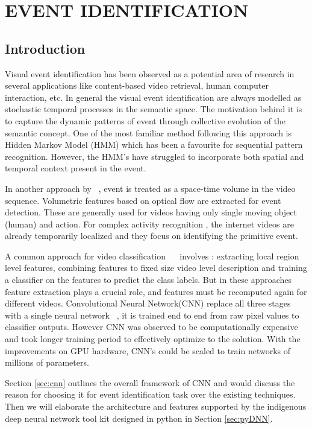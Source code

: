 \chapter{EVENT IDENTIFICATION}
 \label{chap:eventrec}
 \section{Introduction}
Visual event identification has been observed as a potential area of research in several applications like  content-based video retrieval, human computer interaction, etc.  In general the visual event identification are always modelled as stochastic temporal processes in the semantic space.  The motivation behind it is to capture the dynamic patterns of event through collective evolution of the semantic concept.  One of the most familiar method following this approach is Hidden Markov Model (HMM) which has been a favourite for 	sequential pattern recognition.  However, the HMM's have struggled to incorporate both spatial and temporal context present in the event.  
\par In another approach by ~\cite{YanKe05}, event is treated as a space-time volume in the video sequence.  Volumetric features based on optical flow are extracted for event detection.  These are generally used for videos having only single moving object (human) and action.  For complex activity recognition \citep{YanKe07}, the internet videos are already temporarily localized and they focus on identifying the primitive event.
\par A common approach for video classification ~\citep{Liu09}~\citep{Niebles10} involves : extracting local region level features, combining features to fixed size video level description and training a classifier on the features to predict the class labels.  But in these approaches feature extraction plays a crucial role, and features must be recomputed again for different videos.  Convolutional Neural Network(CNN) replace all three stages with a single neural network ~\cite{Ji13}, it is trained end to end from raw pixel values to classifier outputs.  However CNN was observed to be computationally expensive and took longer training period to effectively optimize to the solution.  With the improvements on GPU hardware, CNN's could be scaled to train networks of millions of parameters.

\par Section \ref{sec:cnn} outlines the overall framework of CNN and would discuss the reason for choosing it for event identification task over the existing techniques.  Then we will elaborate the architecture and features supported by the indigenous deep neural network tool kit designed in python in Section \ref{sec:pyDNN}. 

